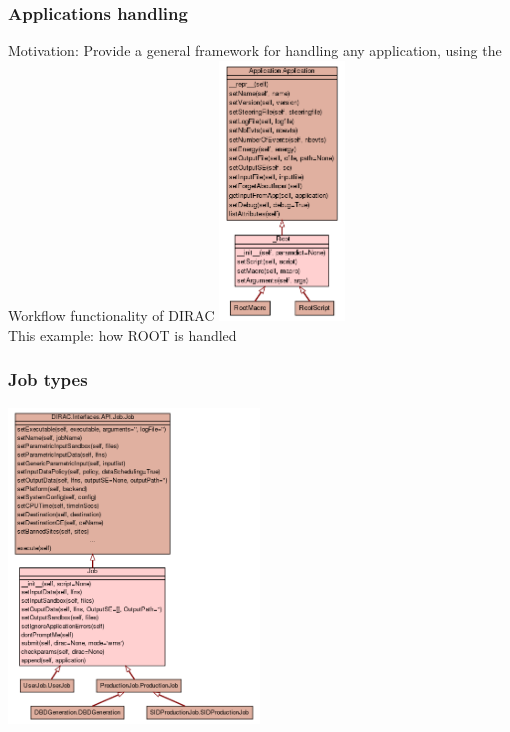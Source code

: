 \documentclass{beamer}
\begin{document}
\begin{frame}
  \frametitle{Applications handling}
Motivation: Provide a general framework for handling any application,
using the Workflow functionality of DIRAC
\centering \includegraphics[width=0.25\textwidth]{ApplicationClassExample.png}\\
This example: how ROOT is handled
\end{frame}
\begin{frame}
  \frametitle{Job types}
\centering
 \includegraphics[width=0.5\textwidth]{JobClassDiagram.png}\\
\end{frame}
\end{document}
